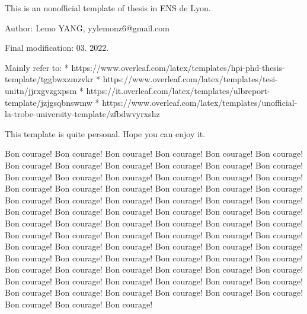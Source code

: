 
This is an nonofficial template of thesis in ENS de Lyon. 

Author: Lemo YANG, yylemonz6@gmail.com

Final modification: 03. 2022.

Mainly refer to: 
    * https://www.overleaf.com/latex/templates/hpi-phd-thesis-template/tggbwxzmzvkr
    * https://www.overleaf.com/latex/templates/tesi-unitn/jjrxgvzgxpsm
    * https://it.overleaf.com/latex/templates/ulbreport-template/jzjgsqbnswmw
    * https://www.overleaf.com/latex/templates/unofficial-la-trobe-university-template/zfbdwvyrxshz

This template is quite personal. Hope you can enjoy it. 

Bon courage! Bon courage! Bon courage! Bon courage! Bon courage! Bon courage! Bon courage! Bon courage! Bon courage! Bon courage! Bon courage! Bon courage! Bon courage! Bon courage! Bon courage! Bon courage! Bon courage! Bon courage! Bon courage! Bon courage! Bon courage! Bon courage! Bon courage! Bon courage! Bon courage! Bon courage! Bon courage! Bon courage! Bon courage! Bon courage! Bon courage! Bon courage! Bon courage! Bon courage! Bon courage! Bon courage! Bon courage! Bon courage! Bon courage! Bon courage! Bon courage! Bon courage! Bon courage! Bon courage! Bon courage! Bon courage! Bon courage! Bon courage! Bon courage! Bon courage! Bon courage! Bon courage! Bon courage! Bon courage! Bon courage! Bon courage! Bon courage! Bon courage! Bon courage! Bon courage! Bon courage! Bon courage! Bon courage! Bon courage! Bon courage! Bon courage! Bon courage! Bon courage! Bon courage! Bon courage! Bon courage! Bon courage! Bon courage! Bon courage! Bon courage! Bon courage! Bon courage! Bon courage! Bon courage! Bon courage! Bon courage! 